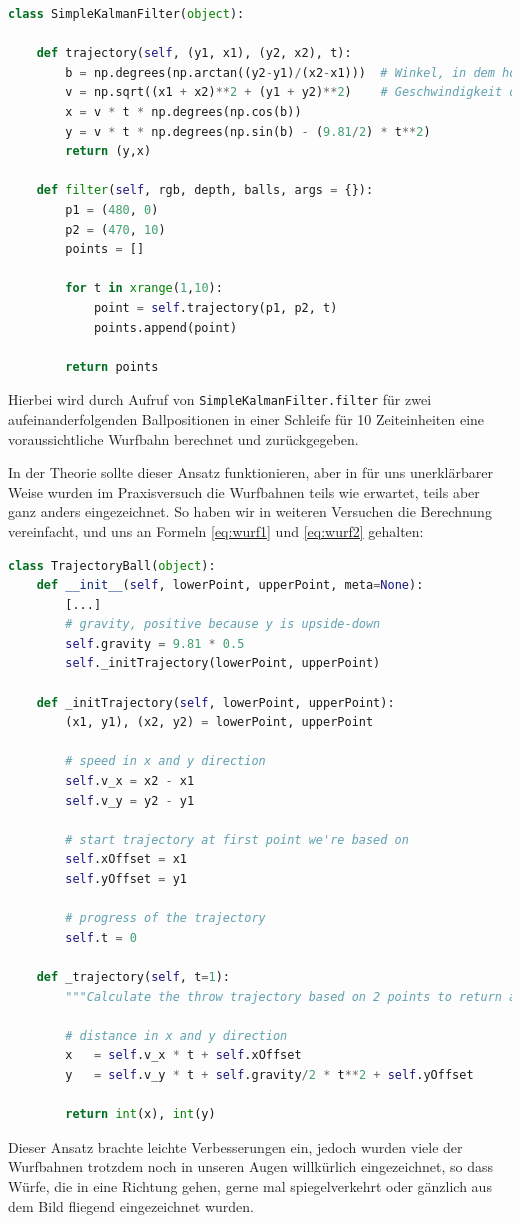\documentclass[12pt,a4paper,ngerman]{scrartcl}
\begin{document}
\begin{lstlisting}[language=Python]
class SimpleKalmanFilter(object):

    def trajectory(self, (y1, x1), (y2, x2), t):
        b = np.degrees(np.arctan((y2-y1)/(x2-x1)))  # Winkel, in dem hochgeworfen wird
        v = np.sqrt((x1 + x2)**2 + (y1 + y2)**2)    # Geschwindigkeit des Balls
        x = v * t * np.degrees(np.cos(b))
        y = v * t * np.degrees(np.sin(b) - (9.81/2) * t**2)
        return (y,x)

    def filter(self, rgb, depth, balls, args = {}):
        p1 = (480, 0)
        p2 = (470, 10)
        points = []

        for t in xrange(1,10):
            point = self.trajectory(p1, p2, t)
            points.append(point)

        return points
\end{lstlisting}
Hierbei wird durch Aufruf von {\tt SimpleKalmanFilter.filter} für zwei aufeinanderfolgenden Ballpositionen in einer Schleife für 10 Zeiteinheiten eine voraussichtliche Wurfbahn berechnet und zurückgegeben.

In der Theorie sollte dieser Ansatz funktionieren, aber in für uns unerklärbarer Weise wurden im Praxisversuch die Wurfbahnen teils wie erwartet, teils aber ganz anders eingezeichnet. So haben wir in weiteren Versuchen die Berechnung vereinfacht, und uns an Formeln \ref{eq:wurf1} und \ref{eq:wurf2} gehalten:

\begin{lstlisting}[language=Python]
class TrajectoryBall(object):
    def __init__(self, lowerPoint, upperPoint, meta=None):
        [...]
        # gravity, positive because y is upside-down
        self.gravity = 9.81 * 0.5
        self._initTrajectory(lowerPoint, upperPoint)

    def _initTrajectory(self, lowerPoint, upperPoint):
        (x1, y1), (x2, y2) = lowerPoint, upperPoint

        # speed in x and y direction
        self.v_x = x2 - x1
        self.v_y = y2 - y1

        # start trajectory at first point we're based on
        self.xOffset = x1
        self.yOffset = y1

        # progress of the trajectory
        self.t = 0

    def _trajectory(self, t=1):
        """Calculate the throw trajectory based on 2 points to return any future or past point on that trajectory"""

        # distance in x and y direction
        x   = self.v_x * t + self.xOffset
        y   = self.v_y * t + self.gravity/2 * t**2 + self.yOffset

        return int(x), int(y)
\end{lstlisting}
Dieser Ansatz brachte leichte Verbesserungen ein, jedoch wurden viele der Wurfbahnen trotzdem noch in unseren Augen willkürlich eingezeichnet, so dass Würfe, die in eine Richtung gehen, gerne mal spiegelverkehrt oder gänzlich aus dem Bild fliegend eingezeichnet wurden.
\end{document}

